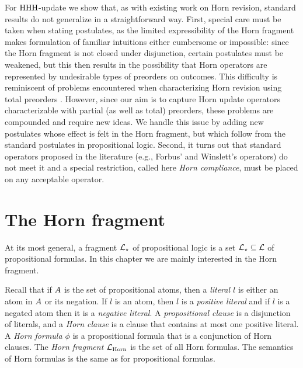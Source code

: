 For ${\mathrm{HHH}}$-update we show that,
as with existing work on Horn revision,
standard results do not generalize in a straightforward way.
First, special care must be taken when stating postulates,
as the limited expressibility of the Horn fragment
makes formulation of familiar intuitions 
either cumbersome or impossible: 
since the Horn fragment is not closed under disjunction,
certain postulates must be weakened,
but this then results in the possibility that Horn operators 
are represented by undesirable types of preorders
on outcomes.
This difficulty is reminiscent of 
problems encountered when characterizing 
Horn revision using total preorders \cite{DelgrandeP15}.
However, since our aim is to capture Horn update operators 
characterizable with partial (as well as total) preorders,
these problems are compounded and require new ideas.
We handle this issue by adding new postulates
whose effect is felt in the Horn fragment,
but which follow from the standard postulates
in propositional logic.
Second,
it turns out that standard operators
proposed in the literature (e.g., Forbus' and Winslett's operators)
do not meet it
and a special restriction,
called here \emph{Horn compliance},
must be placed on any acceptable operator.


























\section{The Horn fragment}\label{sec:6-horn-fragment}
At its most general, 
a fragment $\mathcal{L}_\star$ of propositional logic 
is a set $\mathcal{L}_\star\subseteq\mathcal{L}$ of propositional formulas.
In this chapter we are mainly interested in the Horn fragment.

Recall that if $A$ is the set of propositional atoms,
then a \emph{literal $l$} is either an atom in $A$ or its negation.
If $l$ is an atom, then $l$ is a \emph{positive literal}
and if $l$ is a negated atom then it is a \emph{negative literal}.
A \emph{propositional clause} is a disjunction of literals,
and a \emph{Horn clause} is a clause that contains at most one positive literal.
A \emph{Horn formula $\phi$} is 
a propositional formula that is a conjunction of Horn clauses.
The \emph{Horn fragment $\mathcal{L}_{\mathrm{Horn}}$} is the set of all Horn formulas.
The semantics of Horn formulas is the same as for propositional formulas.

